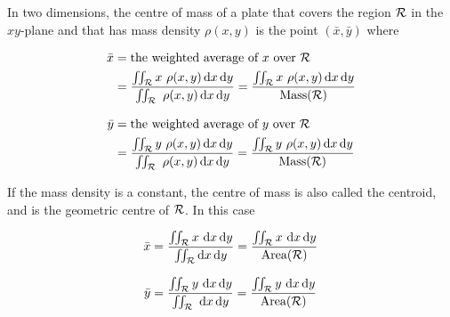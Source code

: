 In two dimensions, the centre of mass of a plate that covers the 
region $\mathcal{R}$ in the $xy$-plane and that has mass density $\rho(x,y)$ 
is the point  $(\bar x, \bar y)$ where
\begin{impeqn}\label{eq cofm}
\begin{align*}
\bar x & = \text{the weighted average of $x$ over $\mathcal{R}$} \\
       &=\frac{\iint_{\mathcal{R}} x\ \rho(x,y)\, \mathrm{d}x\,\mathrm{d}y}
                      {\iint_{\mathcal{R}} \ \rho(x,y)\, \mathrm{d}x\,\mathrm{d}y}
        =\frac{\iint_{\mathcal{R}} x\ \rho(x,y)\, \mathrm{d}x\,\mathrm{d}y}
                            {\text{Mass}(\mathcal{R})} \\[0.1in]
\bar y & = \text{the weighted average of $y$ over $\mathcal{R}$} \\
       &=\frac{\iint_{\mathcal{R}} y\ \rho(x,y)\, \mathrm{d}x\,\mathrm{d}y}
                     {\iint_{\mathcal{R}} \ \rho(x,y)\, \mathrm{d}x\,\mathrm{d}y}
        =\frac{\iint_{\mathcal{R}} y\ \rho(x,y)\, \mathrm{d}x\,\mathrm{d}y}
                        {\text{Mass}(\mathcal{R})} 
\end{align*}
\end{impeqn}
If the mass density is a constant, the centre of mass is also
called the centroid, and is the geometric centre of $\mathcal{R}$.
In this case
\begin{impeqn}[Centroid]\label{eq centroid}
\begin{align*}
\bar x &=\frac{\iint_{\mathcal{R}} x\ \mathrm{d}x\,\mathrm{d}y}
                      {\iint_{\mathcal{R}}  \mathrm{d}x\,\mathrm{d}y}
        =\frac{\iint_{\mathcal{R}} x\ \mathrm{d}x\,\mathrm{d}y}
                            {\text{Area}(\mathcal{R})} \\[0.1in]
\bar y &=\frac{\iint_{\mathcal{R}} y\ \mathrm{d}x\,\mathrm{d}y}
                     {\iint_{\mathcal{R}} \  \mathrm{d}x\,\mathrm{d}y}
        =\frac{\iint_{\mathcal{R}} y\  \mathrm{d}x\,\mathrm{d}y}
                        {\text{Area}(\mathcal{R})} 
\end{align*}
\end{impeqn}

